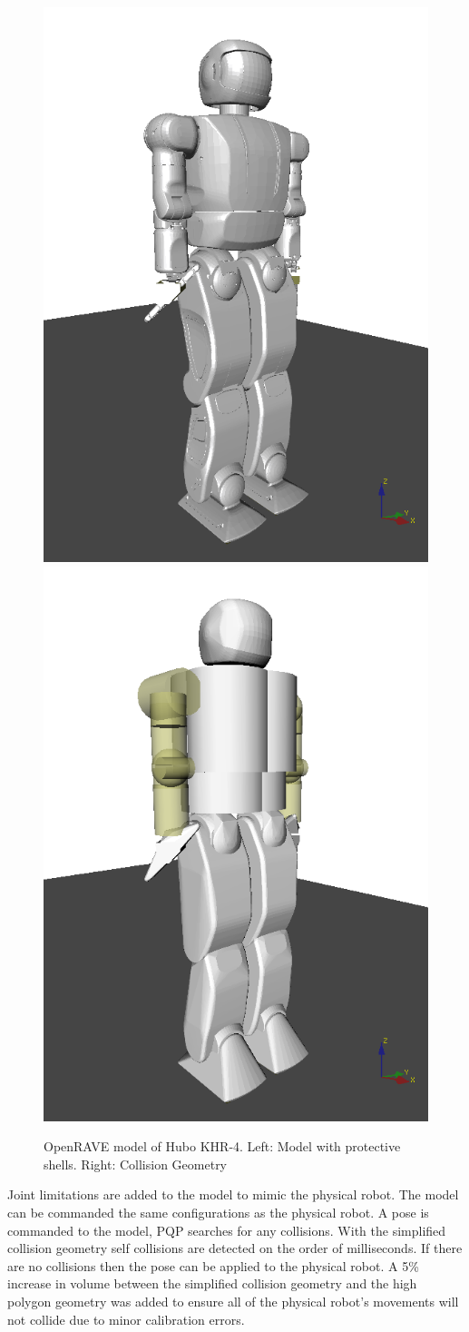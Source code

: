 \begin{figure}[thpb]
  \centering
\includegraphics[width=0.5\columnwidth]{./pictures/final/hBody.png}\includegraphics[width=0.5\columnwidth]{./pictures/final/hCol.png}
  \caption{OpenRAVE model of Hubo KHR-4. Left: Model with protective shells.  Right: Collision Geometry  }
  \label{fig:vHubo}
\end{figure}

Joint limitations are added to the model to mimic the physical robot.  The model can be commanded the same configurations as the physical robot.  A pose is commanded to the model, PQP searches for any collisions.  With the simplified collision geometry self collisions are detected on the order of milliseconds.  If there are no collisions then the pose can be applied to the physical robot.  A 5\% increase in volume between the simplified collision geometry and the high polygon geometry was added to ensure all of the physical robot's movements will not collide due to minor calibration errors.


